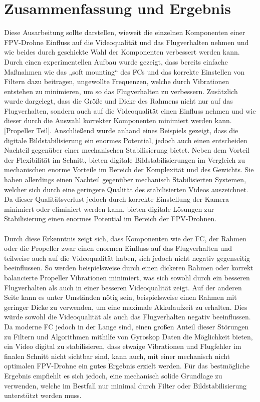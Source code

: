 \section[Zusammenfassung und Ergebnis]{Zusammenfassung und Ergebnis}
Diese Ausarbeitung sollte darstellen, wieweit die einzelnen Komponenten einer FPV-Drohne Einfluss auf die Videoqualität und das Flugverhalten nehmen und wie beides durch geschickte Wahl der Komponenten verbessert werden kann. Durch einen experimentellen Aufbau wurde gezeigt, dass bereits einfache Maßnahmen wie das „soft mounting“ des FCs und das korrekte Einstellen von Filtern dazu beitragen, ungewollte Frequenzen, welche durch Vibrationen entstehen zu minimieren, um so das Flugverhalten zu verbessern. Zusätzlich wurde dargelegt, dass die Größe und Dicke des Rahmens nicht nur auf das Flugverhalten, sondern auch auf die Videoqualität einen Einfluss nehmen und wie dieser durch die Auswahl korrekter Komponenten minimiert werden kann. [Propeller Teil]. Anschließend wurde anhand eines Beispiels gezeigt, dass die digitale Bildstabilisierung ein enormes Potential, jedoch auch einen entscheiden Nachteil gegenüber einer mechanischen Stabilisierung bietet. Neben dem Vorteil der Flexibilität im Schnitt, bieten digitale Bildstabilisierungen im Vergleich zu mechanischen enorme Vorteile im Bereich der Komplexität und des Gewichts. Sie haben allerdings einen Nachteil gegenüber mechanisch Stabilisierten Systemen, welcher sich durch eine geringere Qualität des stabilisierten Videos auszeichnet. Da dieser Qualitätsverlust jedoch durch korrekte Einstellung der Kamera minimiert oder eliminiert werden kann, bieten digitale Lösungen zur Stabilisierung einen enormes Potential im Bereich der FPV-Drohnen.
\\ \\
Durch diese Erkenntnis zeigt sich, dass Komponenten wie der FC, der Rahmen oder die Propeller zwar einen enormen Einfluss auf das Flugverhalten und teilweise auch auf die Videoqualität haben, sich jedoch nicht negativ gegenseitig beeinflussen. So werden beispielsweise durch einen dickeren Rahmen oder korrekt balancierte Propeller Vibrationen minimiert, was sich sowohl durch ein besseren Flugverhalten als auch in einer besseren Videoqualität zeigt. Auf der anderen Seite kann es unter Umständen nötig sein, beispielsweise einen Rahmen mit geringer Dicke zu verwenden, um eine maximale Akkulaufzeit zu erhalten. Dies würde sowohl die Videoqualität als auch das Flugverhalten negativ beeinflussen. Da moderne FC jedoch in der Lange sind, einen großen Anteil dieser Störungen zu Filtern und Algorithmen mithilfe von Gyroskop Daten die Möglichkeit bieten, ein Video digital zu stabilisieren, dass etwaige Vibrationen und Flugfehler im finalen Schnitt nicht sichtbar sind, kann auch, mit einer mechanisch nicht optimalen FPV-Drohne ein gutes Ergebnis erzielt werden. Für das bestmögliche Ergebnis empfiehlt es sich jedoch, eine mechanisch solide Grundlage zu verwenden, welche im Bestfall nur minimal durch Filter oder Bildstabilisierung unterstützt werden muss.